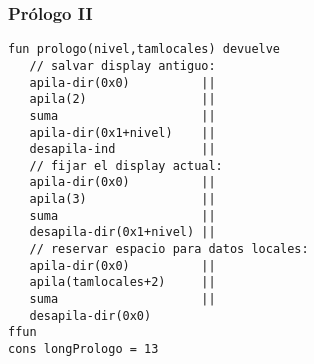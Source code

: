 \documentclass[hyperref={pdfpagelabels=false},tree-dvips,compress]{beamer}
\begin{document}
\begin{frame}[fragile]
\frametitle{Prólogo II}

\begin{lstlisting}[style=codigoMP,basicstyle=\scriptsize\ttfamily]
fun prologo(nivel,tamlocales) devuelve
   // salvar display antiguo:
   apila-dir(0x0)          ||
   apila(2)                ||
   suma                    ||
   apila-dir(0x1+nivel)    ||
   desapila-ind            ||
   // fijar el display actual:
   apila-dir(0x0)          ||
   apila(3)                ||
   suma                    ||
   desapila-dir(0x1+nivel) ||
   // reservar espacio para datos locales:
   apila-dir(0x0)          ||
   apila(tamlocales+2)     ||
   suma                    ||
   desapila-dir(0x0)
ffun
cons longPrologo = 13
\end{lstlisting}


\end{frame}
\end{document}
